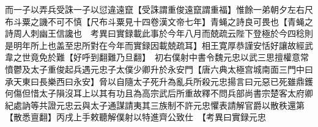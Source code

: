 而一子以弄兵受誅一子以愆違遠竄【受誅謂重俊遠竄謂重福】惟餘一弟朝夕左右尺布斗粟之譏不可不慎【尺布斗粟見十四卷漢文帝七年】青蝇之詩良可畏也【青蝇之詩周人刺幽王信讒也　考異曰實録載此事於今年八月而兢疏云陛下登極於今四稔則是明年所上也盖至忠所對在今年而實録因載兢疏耳】相王寛厚恭謹安恬好讓故經武韋之世竟免於難【好呼到翻難乃旦翻】　初右僕射中書令魏元忠以武三思擅權意常憤鬱及太子重俊起兵遇元忠子太僕少卿升於永安門【唐六典太極宫城南面三門中曰承天東曰長樂西曰永安】脅以自隨太子死升為亂兵所殺元忠揚言曰元惡已死雖鼎鑊何傷但惜太子隕沒耳上以其有功且為高宗武后所重故釋不問兵部尚書宗楚客太府卿紀處訥等共證元忠云與太子通謀請夷其三族制不許元忠懼表請解官爵以散秩還第【散悉亶翻】丙戌上手敕聽解僕射以特進齊公致仕　【考異曰實録元忠